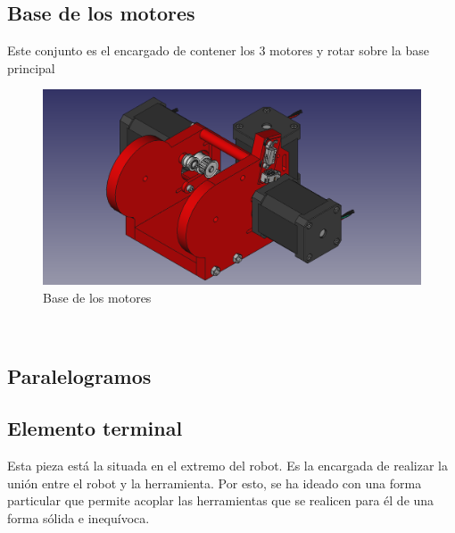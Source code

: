 \subsection{Base de los motores}
Este conjunto es el encargado de contener los 3 motores y rotar sobre la base principal
\begin{figure} [ht!]
  \begin{center}
    \includegraphics[width=12cm]{figs/base_motores.png}
  \end{center}
  \caption{Base de los motores}
\end{figure}\ 

\subsection{Paralelogramos}
\newpage
\subsection{Elemento terminal}
\noindent Esta pieza está la situada en el extremo del robot. Es la encargada de realizar la unión entre el robot y la herramienta. Por esto, 
se ha ideado con una forma particular que permite acoplar las herramientas que se realicen para él de una forma sólida e inequívoca. 

